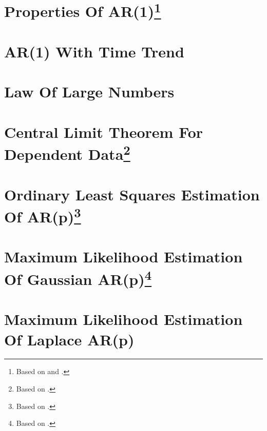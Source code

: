 \documentclass[a4paper]{scrartcl}
\begin{document}
    \section[Properties of AR(1)]{Properties Of AR(1)\footnote{Based on \citet[Ch.~2]{BjornlandThorsrud.2015} and \citet{Luetkepohl.2004}.}}\label{ex:PropertiesAR1}
    
    
    \section[AR(1) With Time Trend]{AR(1) With Time Trend}\label{ex:AR1timetrend}
    
    
    \section[Law Of Large Numbers]{Law Of Large Numbers}\label{ex:LLN}
    
    
    \section[Central Limit Theorem For Dependent Data]{Central Limit Theorem For Dependent Data\footnote{Based on \citet{CrackLedoit.2010}.}}\label{ex:CLTDep}
    
    
    \section[Ordninary Least Squares Estimation Of AR(p)]{Ordinary Least Squares Estimation Of AR(p)\footnote{Based on \cite{Luetkepohl.2004}.}}\label{ex:OLSARp}
    
    
    \section[Maximum Likelihood Estimation Of Gaussian AR(p)]{Maximum Likelihood Estimation Of Gaussian AR(p)\footnote{Based on \cite{Luetkepohl.2004}.}}\label{ex:MLARpGaussian}
    
    
    \section[Maximum Likelihood Estimation Of Laplace AR(p)]{Maximum Likelihood Estimation Of Laplace AR(p)}\label{ex:MLARpLaPlace}
    
    
\end{document}
